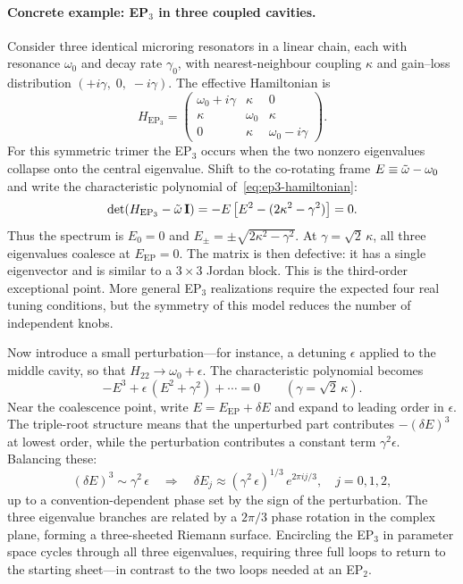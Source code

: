 \paragraph{Concrete example: EP$_3$ in three coupled cavities.}
Consider three identical microring resonators in a linear chain, each
with resonance $\omega_0$ and decay rate $\gamma_0$, with nearest-neighbour
coupling $\kappa$ and gain--loss distribution
$(+i\gamma,\; 0,\; -i\gamma)$. The effective Hamiltonian is
\begin{equation}
 H_{\mathrm{EP}_3} = \begin{pmatrix}
 \omega_0 + i\gamma & \kappa & 0 \\
 \kappa & \omega_0 & \kappa \\
 0 & \kappa & \omega_0 - i\gamma
 \end{pmatrix}.
 \label{eq:ep3-hamiltonian}
\end{equation}
For this symmetric trimer the EP$_3$ occurs when the two nonzero
eigenvalues collapse onto the central eigenvalue. Shift to the
co-rotating frame $E \equiv \tilde{\omega} - \omega_0$ and write the
characteristic polynomial of~\eqref{eq:ep3-hamiltonian}:
\begin{equation}
 \det(H_{\mathrm{EP}_3} - \tilde{\omega}\,\mathbf{I})
 = -E\left[E^2 - (2\kappa^2-\gamma^2)\right] = 0.
 \label{eq:ep3-charpoly}
\end{equation}
Thus the spectrum is $E_0=0$ and
$E_\pm=\pm\sqrt{2\kappa^2-\gamma^2}$. At
$\gamma=\sqrt{2}\,\kappa$, all three eigenvalues coalesce at
$E_{\mathrm{EP}}=0$. The matrix is then defective: it has a single
eigenvector and is similar to a $3\times3$ Jordan block. This is the
third-order exceptional point. More general EP$_3$ realizations require
the expected four real tuning conditions, but the symmetry of this model
reduces the number of independent knobs.

Now introduce a small perturbation---for instance, a detuning
$\epsilon$ applied to the middle cavity, so that
$H_{22} \to \omega_0 + \epsilon$. The characteristic polynomial
becomes
\begin{equation}
 -E^3 + \epsilon\,(E^2+\gamma^2) + \cdots = 0
 \qquad (\gamma=\sqrt{2}\,\kappa).
 \label{eq:ep3-perturbed}
\end{equation}
Near the coalescence point, write $E = E_{\mathrm{EP}} + \delta E$ and
expand to leading order in $\epsilon$. The triple-root structure means
that the unperturbed part contributes $-(\delta E)^3$ at lowest order,
while the perturbation contributes a constant term
$\gamma^2\epsilon$.
Balancing these:
\begin{equation}
 (\delta E)^3 \sim \gamma^2\,\epsilon
 \quad\Longrightarrow\quad
 \delta E_j \approx (\gamma^2\,\epsilon)^{1/3}\,e^{2\pi i j/3},
 \quad j = 0, 1, 2,
 \label{eq:ep3-cuberoot}
\end{equation}
up to a convention-dependent phase set by the sign of the perturbation.
The three eigenvalue branches are related by a
$2\pi/3$ phase rotation in the complex plane, forming a three-sheeted
Riemann surface. Encircling the EP$_3$ in parameter space cycles
through all three eigenvalues, requiring three full loops to return to
the starting sheet---in contrast to the two loops needed at an EP$_2$.

